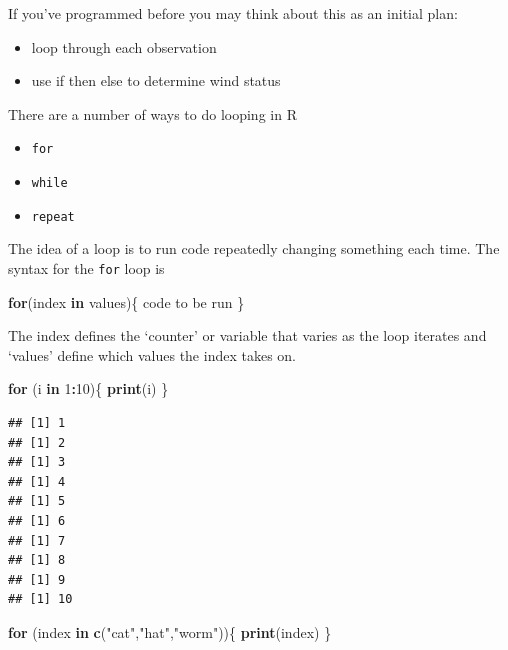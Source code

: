 \documentclass[
]{book}
\newenvironment{Shaded}{\begin{snugshade}}{\end{snugshade}}
\newcommand{\ControlFlowTok}[1]{\textcolor[rgb]{0.13,0.29,0.53}{\textbf{#1}}}
\newcommand{\DecValTok}[1]{\textcolor[rgb]{0.00,0.00,0.81}{#1}}
\newcommand{\KeywordTok}[1]{\textcolor[rgb]{0.13,0.29,0.53}{\textbf{#1}}}
\newcommand{\NormalTok}[1]{#1}
\newcommand{\OperatorTok}[1]{\textcolor[rgb]{0.81,0.36,0.00}{\textbf{#1}}}
\newcommand{\StringTok}[1]{\textcolor[rgb]{0.31,0.60,0.02}{#1}}
\theoremstyle{definition}
\theoremstyle{definition}
\theoremstyle{definition}
\theoremstyle{remark}
\begin{document}
If you've programmed before you may think about this as an initial plan:

\begin{itemize}
\item
  loop through each observation
\item
  use if then else to determine wind status
\end{itemize}

There are a number of ways to do looping in R

\begin{itemize}
\item
  \texttt{for}
\item
  \texttt{while}
\item
  \texttt{repeat}
\end{itemize}

The idea of a loop is to run code repeatedly changing something each time. The syntax for the \texttt{for} loop is

\begin{Shaded}
\begin{Highlighting}[]
\ControlFlowTok{for}\NormalTok{(index }\ControlFlowTok{in}\NormalTok{ values)\{}
\NormalTok{  code to be run}
\NormalTok{\}}
\end{Highlighting}
\end{Shaded}

The index defines the `counter' or variable that varies as the loop iterates and `values' define which values the index takes on.

\begin{Shaded}
\begin{Highlighting}[]
\ControlFlowTok{for}\NormalTok{ (i }\ControlFlowTok{in} \DecValTok{1}\OperatorTok{:}\DecValTok{10}\NormalTok{)\{}
  \KeywordTok{print}\NormalTok{(i)}
\NormalTok{\}}
\end{Highlighting}
\end{Shaded}

\begin{verbatim}
## [1] 1
## [1] 2
## [1] 3
## [1] 4
## [1] 5
## [1] 6
## [1] 7
## [1] 8
## [1] 9
## [1] 10
\end{verbatim}

\begin{Shaded}
\begin{Highlighting}[]
\ControlFlowTok{for}\NormalTok{ (index }\ControlFlowTok{in} \KeywordTok{c}\NormalTok{(}\StringTok{"cat"}\NormalTok{,}\StringTok{"hat"}\NormalTok{,}\StringTok{"worm"}\NormalTok{))\{}
  \KeywordTok{print}\NormalTok{(index)}
\NormalTok{\}}
\end{Highlighting}
\end{Shaded}
\end{document}
